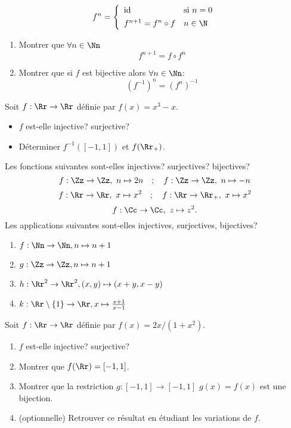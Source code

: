 \documentclass[10pt, a4paper, twocolumn]{homework}
\begin{document}
\begin{equation*}
  f^{n} = \left\{
    \begin{array}{ll}
      \text{id} & \text{si } n=0\\[4pt]
      f^{n+1} = f^n \circ f & n \in \N
    \end{array}
  \right.
\end{equation*}


\begin{enumerate}
\item Montrer que $\forall n \in \Nn$ $$f^{n + 1} = f \circ f^n$$
\item Montrer que si $f$ est bijective alors $\forall n \in \Nn$: $$ (f^{-1})^n
 = (f^n)^{-1}$$
 \end{enumerate}
Soit $f  : \Rr \rightarrow \Rr$ d\'efinie par $f(x) = x^3-x$.
\begin{itemize}
  \item $f$ est-elle injective? surjective?
  \item D\'eterminer $f^{-1}([-1,1])$ et $f(\Rr_+)$.
\end{itemize}
Les fonctions suivantes sont-elles injectives? surjectives? bijectives?
$$ f : \Zz\rightarrow\Zz, \ n\mapsto 2n \quad ; \quad f : \Zz\rightarrow\Zz ,\ n\mapsto -n $$
$$ f:\Rr\rightarrow\Rr ,\ x\mapsto x^2 \quad ; \quad f : \Rr\rightarrow\Rr_+ ,\ x\mapsto x^2 $$
$$   f : \Cc\rightarrow\Cc ,\ z\mapsto z^2.$$
Les applications suivantes sont-elles injectives, surjectives, bijectives?
\begin{enumerate}
\item $f : {\Nn} \to {\Nn}, {n} \mapsto {n + 1}$
\item $g : {\Zz} \to {\Zz}, {n}\mapsto{n + 1}$
\item $h : {\Rr^2} \to {\Rr^2}, {(x, y)}\mapsto{ (x + y, x-y)}$
\item $k : {\Rr \setminus \left\{ 1\right\}} \to {\Rr}, {x}\mapsto{\frac{x + 1}{x - 1}}$
\end{enumerate}
Soit $f  : \Rr \rightarrow \Rr$ d\'efinie par $f(x) = 2x/(1+x^2)$.
\begin{enumerate}
    \item $f$ est-elle injective? surjective?
    \item Montrer que $f(\Rr)=[-1,1]$.
    \item Montrer que la restriction $g  : [-1,1] \rightarrow [-1,1]$  $g(x) = f(x)$
est une bijection.
    \item (optionnelle) Retrouver ce r\'esultat en \'etudiant les variations de $f$.
\end{enumerate}
\end{document}
